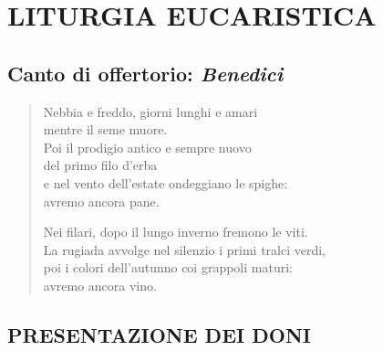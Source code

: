 
\section*{LITURGIA EUCARISTICA}

\subsection*{Canto di offertorio: \textit{Benedici}}

\begin{verse}
\begin{mystrofe}
Nebbia e freddo, giorni lunghi e amari \\
mentre il seme muore. \\
Poi il prodigio antico e sempre nuovo \\
del primo filo d'erba \\
e nel vento dell'estate ondeggiano le spighe: \\
avremo ancora pane.
\end{mystrofe}


\begin{mystrofe}
Nei filari, dopo il lungo inverno fremono le viti. \\
La rugiada avvolge nel silenzio i primi tralci verdi, \\
poi i colori dell'autunno coi grappoli maturi: \\
avremo ancora vino.
\end{mystrofe}

\end{verse}

\subsection*{PRESENTAZIONE DEI DONI}

